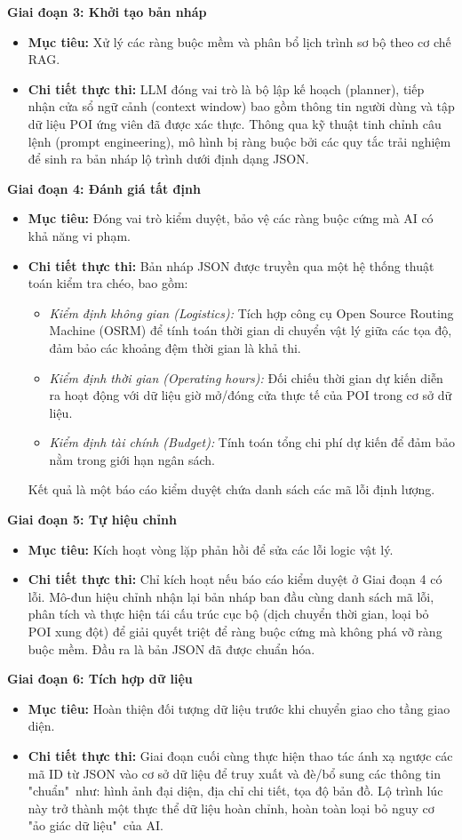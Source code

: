 \textbf{Giai đoạn 3: Khởi tạo bản nháp}
\begin{itemize}
\item \textbf{Mục tiêu:} Xử lý các ràng buộc mềm và phân bổ lịch trình sơ bộ theo cơ chế RAG.
\item \textbf{Chi tiết thực thi:} LLM đóng vai trò là bộ lập kế hoạch (planner), tiếp nhận cửa sổ ngữ cảnh (context window) bao gồm thông tin người dùng và tập dữ liệu POI ứng viên đã được xác thực. Thông qua kỹ thuật tinh chỉnh câu lệnh (prompt engineering), mô hình bị ràng buộc bởi các quy tắc trải nghiệm để sinh ra bản nháp lộ trình dưới định dạng JSON.
\end{itemize}

\textbf{Giai đoạn 4: Đánh giá tất định}
\begin{itemize}
\item \textbf{Mục tiêu:} Đóng vai trò kiểm duyệt, bảo vệ các ràng buộc cứng mà AI có khả năng vi phạm.
\item \textbf{Chi tiết thực thi:} Bản nháp JSON được truyền qua một hệ thống thuật toán kiểm tra chéo, bao gồm:
\begin{itemize}
    \item \textit{Kiểm định không gian (Logistics):} Tích hợp công cụ Open Source Routing Machine (OSRM) để tính toán thời gian di chuyển vật lý giữa các tọa độ, đảm bảo các khoảng đệm thời gian là khả thi.
    \item \textit{Kiểm định thời gian (Operating hours):} Đối chiếu thời gian dự kiến diễn ra hoạt động với dữ liệu giờ mở/đóng cửa thực tế của POI trong cơ sở dữ liệu.
    \item \textit{Kiểm định tài chính (Budget):} Tính toán tổng chi phí dự kiến để đảm bảo nằm trong giới hạn ngân sách.
\end{itemize}
Kết quả là một báo cáo kiểm duyệt chứa danh sách các mã lỗi định lượng.
\end{itemize}

\textbf{Giai đoạn 5: Tự hiệu chỉnh}
\begin{itemize}
    \item \textbf{Mục tiêu:} Kích hoạt vòng lặp phản hồi để sửa các lỗi logic vật lý.
    \item \textbf{Chi tiết thực thi:} Chỉ kích hoạt nếu báo cáo kiểm duyệt ở Giai đoạn 4 có lỗi. Mô-đun hiệu chỉnh nhận lại bản nháp ban đầu cùng danh sách mã lỗi, phân tích và thực hiện tái cấu trúc cục bộ (dịch chuyển thời gian, loại bỏ POI xung đột) để giải quyết triệt để ràng buộc cứng mà không phá vỡ ràng buộc mềm. Đầu ra là bản JSON đã được chuẩn hóa.
\end{itemize}

\textbf{Giai đoạn 6: Tích hợp dữ liệu}
\begin{itemize}
\item \textbf{Mục tiêu:} Hoàn thiện đối tượng dữ liệu trước khi chuyển giao cho tầng giao diện.
\item \textbf{Chi tiết thực thi:} Giai đoạn cuối cùng thực hiện thao tác ánh xạ ngược các mã ID từ JSON vào cơ sở dữ liệu để truy xuất và đè/bổ sung các thông tin "chuẩn"\ như: hình ảnh đại diện, địa chỉ chi tiết, tọa độ bản đồ. Lộ trình lúc này trở thành một thực thể dữ liệu hoàn chỉnh, hoàn toàn loại bỏ nguy cơ "ảo giác dữ liệu"\ của AI.
\end{itemize}

